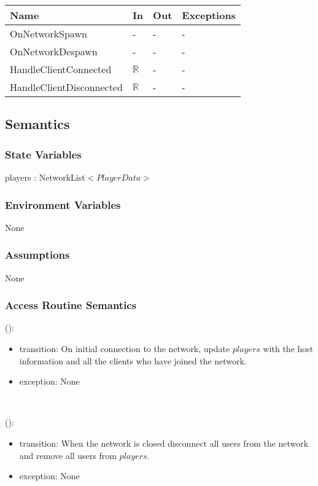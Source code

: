 \documentclass[12pt, titlepage]{article}
\begin{document}
\begin{center}
\begin{tabular}{p{5cm} p{4cm} p{4cm} p{2cm}}
\hline
\textbf{Name} & \textbf{In} & \textbf{Out} & \textbf{Exceptions} \\
\hline
OnNetworkSpawn & - & - & - \\
OnNetworkDespawn  & - & - & - \\
HandleClientConnected  & $\mathbb{R}$ & - & - \\
HandleClientDisconnected  & $\mathbb{R}$ & - & - \\
\hline
\end{tabular}
\end{center}

\subsection{Semantics}

\subsubsection{State Variables}

players : NetworkList$<PlayerData>$

\subsubsection{Environment Variables}

None

\subsubsection{Assumptions}

None

\subsubsection{Access Routine Semantics}

():
\begin{itemize}
\item transition: On initial connection to the network, update $players$ with the host information and all the clients who have joined the network.
\item exception: None
\end{itemize}\

():
\begin{itemize}
\item transition: When the network is closed disconnect all users from the network and remove all users from $players$.
\item exception: None
\end{itemize}
\end{document}
